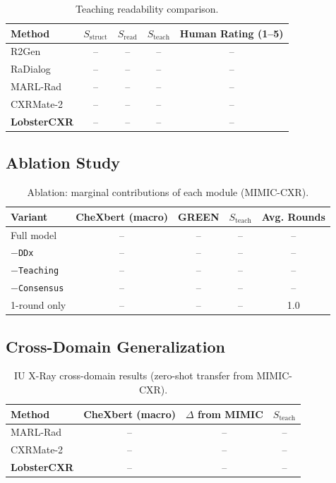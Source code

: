 \documentclass[runningheads,10pt]{llncs}
\newcommand{\Sstruct}{S_{\text{struct}}}
\newcommand{\Sread}{S_{\text{read}}}
\newcommand{\Steach}{S_{\text{teach}}}
\begin{document}
\begin{table}[t]
\centering
\caption{Teaching readability comparison.}
\label{tab:teach}
\small
\begin{tabular}{lCCCC}
\toprule
Method & $\Sstruct$ & $\Sread$ & $\Steach$ & Human Rating (1--5) \\
\midrule
R2Gen & -- & -- & -- & -- \\
RaDialog & -- & -- & -- & -- \\
MARL-Rad & -- & -- & -- & -- \\
CXRMate-2 & -- & -- & -- & -- \\
\midrule
\textbf{LobsterCXR} & -- & -- & -- & -- \\
\bottomrule
\end{tabular}
\end{table}

\subsection{Ablation Study}

\begin{table}[t]
\centering
\caption{Ablation: marginal contributions of each module (MIMIC-CXR).}
\label{tab:ablation}
\small
\begin{tabular}{lCCCC}
\toprule
Variant & CheXbert (macro) & GREEN & $\Steach$ & Avg. Rounds \\
\midrule
Full model & -- & -- & -- & -- \\
$-$\texttt{DDx} & -- & -- & -- & -- \\
$-$\texttt{Teaching} & -- & -- & -- & -- \\
$-$\texttt{Consensus} & -- & -- & -- & -- \\
1-round only & -- & -- & -- & 1.0 \\
\bottomrule
\end{tabular}
\end{table}

\subsection{Cross-Domain Generalization}

\begin{table}[t]
\centering
\caption{IU X-Ray cross-domain results (zero-shot transfer from MIMIC-CXR).}
\label{tab:cross}
\small
\begin{tabular}{lCCC}
\toprule
Method & CheXbert (macro) & $\Delta$ from MIMIC & $\Steach$ \\
\midrule
MARL-Rad & -- & -- & -- \\
CXRMate-2 & -- & -- & -- \\
\textbf{LobsterCXR} & -- & -- & -- \\
\bottomrule
\end{tabular}
\end{table}
\end{document}

